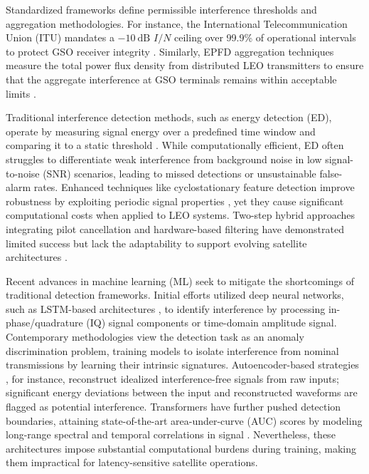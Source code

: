 \documentclass[10pt, conference]{IEEEtran}
\begin{document}
Standardized frameworks define permissible interference thresholds and aggregation methodologies. For instance, the International Telecommunication Union (ITU) mandates a $-10~\text{dB}$ $I / N$ ceiling over 99.9\% of operational intervals to protect GSO receiver integrity \cite{itur2017ProtectionCriteriaOperation}. Similarly, EPFD aggregation techniques measure the total power flux density from distributed LEO transmitters to ensure that the aggregate interference at GSO terminals remains within acceptable limits \cite{itur2002AggregateDownlinkEquivalent}.

Traditional interference detection methods, such as energy detection (ED), operate by measuring signal energy over a predefined time window and comparing it to a static threshold \cite{kay2009fundamentals}. While computationally efficient, ED often struggles to differentiate weak interference from background noise in low signal-to-noise (SNR) scenarios, leading to missed detections or unsustainable false-alarm rates. Enhanced techniques like cyclostationary feature detection improve robustness by exploiting periodic signal properties \cite{experimentalCyclostationary}, yet they cause significant computational costs when applied to LEO systems. Two-step hybrid approaches integrating pilot cancellation and hardware-based filtering have demonstrated limited success but lack the adaptability to support evolving satellite architectures \cite{wangCoFrequencyInterferenceAnalysis2020}.

Recent advances in machine learning (ML) seek to mitigate the shortcomings of traditional detection frameworks. Initial efforts utilized deep neural networks, such as  LSTM-based architectures \cite{pellacoSpectrumPredictionInterference2019}, to identify interference by processing in-phase/quadrature (IQ) signal components or time-domain amplitude signal. Contemporary methodologies view the detection task as an anomaly discrimination problem, training models to isolate interference from nominal transmissions by learning their intrinsic signatures. Autoencoder-based strategies \cite{saifaldawlaConvolutionalAutoencodersNonGeostationary2024}, for instance, reconstruct idealized interference-free signals from raw inputs; significant energy deviations between the input and reconstructed waveforms are flagged as potential interference. Transformers have further pushed detection boundaries, attaining state-of-the-art area-under-curve (AUC) scores by modeling long-range spectral and temporal correlations in signal \cite{saifaldawlaGenAIBasedModelsNGSO2024}. Nevertheless, these architectures impose substantial computational burdens during training, making them impractical for latency-sensitive satellite operations.
\end{document}

